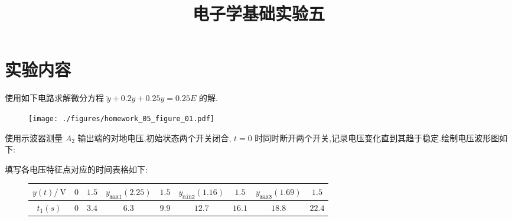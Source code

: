 
\usepackage{../../homeworks_preamble}
\title{电子学基础实验五}


    \maketitle
    \section{实验内容} 使用如下电路求解微分方程 $\ddot{y}+0.2\dot{y}+0.25y=0.25E$ 的解.
    \begin{figure}[htbp]
        \centering
        \texttt{[image: ./figures/homework\_05\_figure\_01.pdf]}
    \end{figure}

    使用示波器测量 $A_2$ 输出端的对地电压,初始状态两个开关闭合, $t=0$ 时同时断开两个开关,记录电压变化直到其趋于稳定.绘制电压波形图如下:
    \begin{figure}[htbp]
        \centering
    \end{figure}
    \newpage
    填写各电压特征点对应的时间表格如下:
    \begin{figure}[htbp]
        \centering
        \begin{tabular}{|c|c|c|c|c|c|c|c|c|}
            \hline$y\left( t \right) /\ \mathrm{V}$ & $0$ & $1.5$ & $y_{\texttt{max1}}\left( 2.25 \right) $ & $1.5$ & $y_{\texttt{min2}}\left( 1.16 \right) $ & $1.5$ & $y_{\texttt{max3}}\left( 1.69 \right) $ & $1.5$ \\\hline
            $t_1\left( s \right) $ & $0$ & $3.4$ & $6.3$ & $9.9$ & $12.7$ & $16.1$ & $18.8$ & $22.4$\\\hline
        \end{tabular}
    \end{figure}
